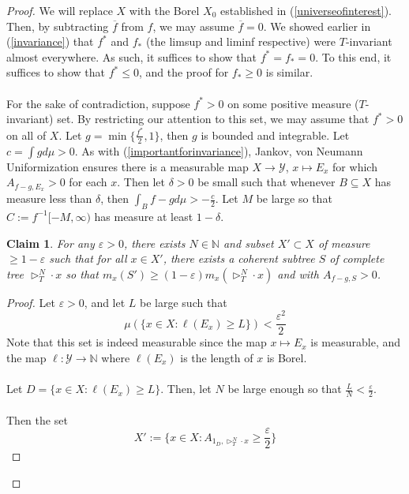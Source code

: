 \documentclass{article}
\newcommand{\N}{\mathbb{N}}
\let\oldref\ref
\renewcommand{\ref}[1]{(\oldref{#1})}
\newtheorem{claim}[theorem]{Claim}
\theoremstyle{definition}
\begin{document}
\begin{proof} 
    We will replace $ X $ with the Borel $ X_0 $ established in \ref{universeofinterest}. Then, by subtracting $ \overline{f} $ from $ f $, we may assume $ \overline{f} = 0 $. We showed earlier in \ref{invariance} that $ f^* $ and $ f_* $ (the limsup and liminf respective) were $ T $-invariant almost everywhere. As such, it suffices to show that $ f^* = f_* = 0 $. To this end, it suffices to show that $ f^*\leq 0 $, and the proof for $ f_*\geq 0 $ is similar.\\\\
    For the sake of contradiction, suppose $ f^*>0 $ on some positive measure ($ T $-invariant) set. By restricting our attention to this set, we may assume that $ f^*>0 $ on all of $ X $. Let $ g = \min\{\frac{f^*}{2},1\} $, then $ g $ is bounded and integrable. Let $ c = \int gd\mu>0 $. As with \ref{importantforinvariance}, Jankov, von Neumann Uniformization ensures there is a measurable map $ X\to \mathcal{Y} $, $ x\mapsto E_x $ for which $ A_{f-g,E_x} > 0 $ for each $ x $. Then let $ \delta>0 $ be small such that whenever $ B\subseteq X $ has measure less than $ \delta $, then $ \int_B f-g d\mu >-\frac{c}{2} $. Let $ M $ be large so that $C:=f^{-1}[-M,\infty) $ has measure at least $ 1-\delta $. 
    \begin{claim}\label{tiling}
        For any $ \varepsilon>0 $, there exists $ N\in \N $ and subset $ X'\subset X $ of measure $ \geq 1-\varepsilon $ such that for all $ x\in X' $, there exists a coherent subtree $ S $ of complete tree $ \triangleright_T^N\cdot x $ so that $ m_x(S')\geq (1-\varepsilon)m_x(\triangleright_T^N\cdot x) $ and with $ A_{f-g,S} >0 $. 
    \end{claim}
    \begin{proof}
        Let $ \varepsilon>0 $, and let $ L $ be large such that 
        \[
        \mu(\{x\in X:\ell(E_x)\geq L\}) < \frac{\varepsilon^2}{2}
        \]
        Note that this set is indeed measurable since the map $ x\mapsto E_x $ is measurable, and the map $ \ell:\mathcal{Y}\rightarrow \mathbb{N} $ where $ \ell(E_x) $ is the length of $ x $ is Borel.\\\\
        Let $ D = \{x\in X:\ell(E_x)\geq L\}$. Then, let $ N $ be large enough so that $ \frac{L}{N}<\frac{\varepsilon}{2} $. \\\\
        Then the set
        \[
        X':=\{x\in X:A_{1_D,\triangleright^N_T\cdot x}\geq \frac{\varepsilon}{2}\}
        \]

\end{proof}
\end{proof}
\end{document}

